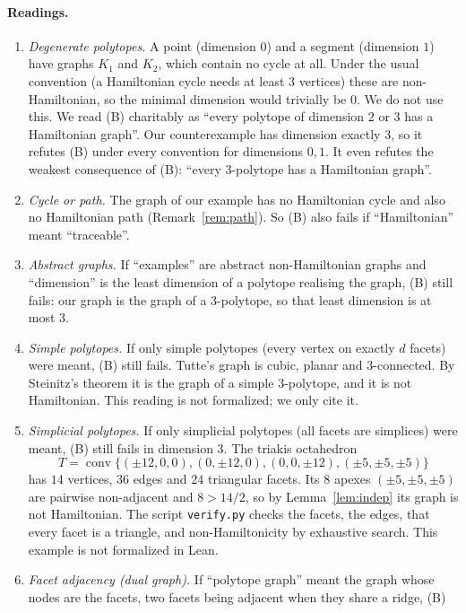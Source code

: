 \documentclass[11pt]{article}
\theoremstyle{definition}
\theoremstyle{remark}
\begin{document}
\paragraph{Readings.}
\begin{enumerate}
\item \emph{Degenerate polytopes.} A point (dimension $0$) and a segment
(dimension $1$) have graphs $K_1$ and $K_2$, which contain no cycle at all. Under
the usual convention (a Hamiltonian cycle needs at least $3$ vertices) these are
non-Hamiltonian, so the minimal dimension would trivially be $0$. We do not use this.
We read (B) charitably as ``every polytope of dimension $2$ or $3$ has a
Hamiltonian graph''. Our counterexample has dimension exactly $3$, so it refutes
(B) under every convention for dimensions $0,1$. It even refutes the weakest
consequence of (B): ``every 3-polytope has a Hamiltonian graph''.
\item \emph{Cycle or path.} The graph of our example has no Hamiltonian cycle
and also no Hamiltonian path (Remark~\ref{rem:path}). So (B) also fails if
``Hamiltonian'' meant ``traceable''.
\item \emph{Abstract graphs.} If ``examples'' are abstract non-Hamiltonian graphs
and ``dimension'' is the least dimension of a polytope realising the graph, (B)
still fails: our graph is the graph of a 3-polytope, so that least dimension is at
most $3$.
\item \emph{Simple polytopes.} If only simple polytopes (every vertex on exactly $d$
facets) were meant, (B) still fails. Tutte's graph \cite{tutte} is cubic, planar
and 3-connected. By Steinitz's theorem it is the graph of a simple 3-polytope, and
it is not Hamiltonian. This reading is not formalized; we only cite it.
\item \emph{Simplicial polytopes.} If only simplicial polytopes (all facets are
simplices) were meant, (B) still fails in dimension $3$. The triakis octahedron
\[T=\operatorname{conv}\{(\pm12,0,0),(0,\pm12,0),(0,0,\pm12),(\pm5,\pm5,\pm5)\}\]
has
$14$ vertices, $36$ edges and $24$ triangular facets. Its $8$ apexes
$(\pm5,\pm5,\pm5)$ are pairwise non-adjacent and $8>14/2$, so by
Lemma~\ref{lem:indep} its graph is not Hamiltonian. The script
\texttt{verify.py} checks the facets, the edges, that every facet is a triangle, and
non-Hamiltonicity by exhaustive search. This example is not formalized in Lean.
\item \emph{Facet adjacency (dual graph).} If ``polytope graph'' meant the graph
whose nodes are the facets, two facets being adjacent when they share a ridge, (B)

\end{enumerate}
\end{document}

